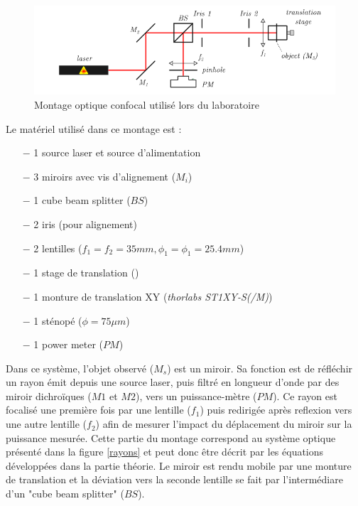 \documentclass[11pt,letterpaper]{article}
\begin{document}
\begin{figure}[H]
  \centering
  \includegraphics[scale=0.7]{Montage laboratoire 1.png}
  \caption{Montage optique confocal utilisé lors du laboratoire}
  \label{montage}
\end{figure}

Le matériel utilisé dans ce montage est :

\begin{itemize}
    \item[$-$]  1 source laser et source d’alimentation
    \item[$-$]  3 miroirs avec vis d’alignement ($M_i$)
    \item[$-$]  1 cube beam splitter ($BS$)
    \item[$-$]  2 iris (pour alignement)
    \item[$-$]  2 lentilles ($f_1 = f_2 = 35 mm, \phi_1 = \phi_1 = 25.4 mm$)
    \item[$-$]  1 stage de translation ()
    \item[$-$]  1 monture de translation XY (\textit{thorlabs ST1XY-S(/M)})
    \item[$-$]  1 sténopé ($\phi = 75μm$)
    \item[$-$]  1 power meter ($PM$)
\end{itemize}

Dans ce système, l'objet observé ($M_s$) est un miroir. Sa fonction est de réfléchir un rayon émit depuis une source laser, puis filtré en longueur d'onde par des miroir dichroïques ($M1$ et $M2$), vers un puissance-mètre ($PM$). Ce rayon est focalisé une première fois par une lentille ($f_1$) puis redirigée après reflexion vers une autre lentille ($f_2$) afin de mesurer l'impact du déplacement du miroir sur la puissance mesurée. Cette partie du montage correspond au système optique présenté dans la figure \ref{rayons} et peut donc être décrit par les équations développées dans la partie théorie. Le miroir est rendu mobile par une monture de translation et la déviation vers la seconde lentille se fait par l'intermédiare d'un "cube beam splitter" ($BS$). \\
\end{document}
